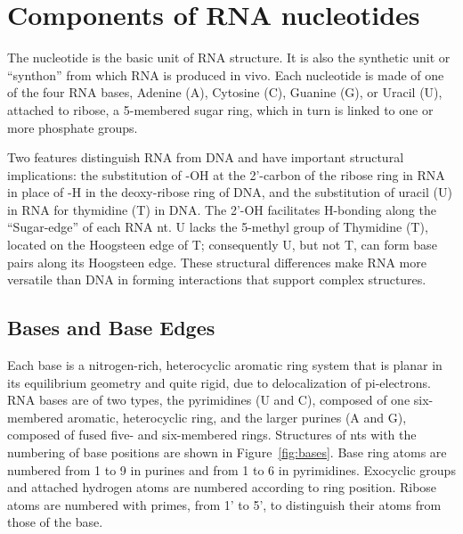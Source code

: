 \section{Components of RNA nucleotides}

The nucleotide is the basic unit of RNA structure. It is also the synthetic unit
or “synthon” from which RNA is produced in vivo. Each nucleotide is made of one
of the four RNA bases, Adenine (A), Cytosine (C), Guanine (G), or Uracil (U),
attached to ribose, a 5-membered sugar ring, which in turn is linked to one or
more phosphate groups. 

Two features distinguish RNA from DNA and have important structural
implications: the substitution of -OH at the 2'-carbon of the ribose ring in RNA
in place of -H in the deoxy-ribose ring of DNA, and the substitution of uracil
(U) in RNA for thymidine (T) in DNA. The 2’-OH facilitates H-bonding along the
``Sugar-edge'' of each RNA nt. U lacks the 5-methyl group of Thymidine (T),
located on the Hoogsteen edge of T; consequently U, but not T, can form base
pairs along its Hoogsteen edge. These structural differences make RNA more
versatile than DNA in forming interactions that support complex structures.

\subsection{Bases and Base Edges}

Each base is a nitrogen-rich, heterocyclic aromatic ring system that is planar
in its equilibrium geometry and quite rigid, due to delocalization of
pi-electrons. RNA bases are of two types, the pyrimidines (U and C), composed of
one six-membered aromatic, heterocyclic ring, and the larger purines (A and G),
composed of fused five- and six-membered rings. Structures of nts with the
numbering of base positions are shown in Figure~\ref{fig:bases}. Base ring atoms are numbered
from 1 to 9 in purines and from 1 to 6 in pyrimidines. Exocyclic groups and
attached hydrogen atoms are numbered according to ring position. Ribose atoms
are numbered with primes, from 1' to 5', to distinguish their atoms from those
of the base. 

